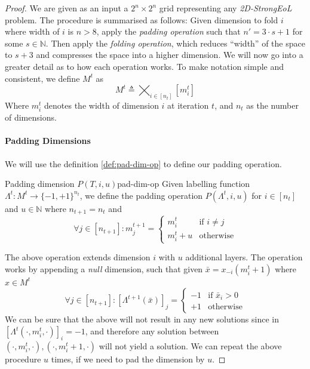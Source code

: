     \begin{proof}
        We are given as an input a $2^n \times 2^n$ grid representing any \textit{2D-StrongEoL} problem.
        The procedure is summarised as follows:
        Given dimension to fold $i$ where width of $i$ is $n > 8$, apply the \textit{padding operation} such that $n' = 3 \cdot s + 1$ for some $s \in \mathbb{N}$.
        Then apply the \textit{folding operation}, which reduces ``width'' of the space to
        $s + 3$ and compresses the space into a higher dimension.
        We will now go into a greater detail as to how each operation works.
        To make notation simple and consistent, we define $M^t$ as
        $$
            M^t \triangleq  \bigtimes_{i \in [n_t]} [m_i^t]
        $$
        Where $m_i^t$ denotes the width of dimension $i$ at iteration $t$, and $n_t$ as the number of dimensions.

        \paragraph*{Padding Dimensions} We will use the definition \ref{def:pad-dim-op} to define our padding operation.

        \begin{definitionbox}{Padding dimension $P(T,i,u)$}{pad-dim-op}
            Given labelling function $\Lambda^t: M^t \to \{-1,+1\}^{n_t}$, we define
            the padding operation $P(\Lambda^t, i, u)$ for $i \in [n_t]$ and $u \in \mathbb{N}$ where
            $n_{t+1} = n_t$ and
            $$
                \forall j \in [n_{t+1}]: m_j^{t+1} = \begin{cases}
                    m^t_i       & \text{if }  i \neq j \\
                    m^{t}_i + u & \text{otherwise}
                \end{cases}
            $$
        \end{definitionbox}

        The above operation extends dimension $i$ with $u$ additional layers.
        The operation works by appending a \textit{null} dimension, such that
        given $\bar{x} = x_{-i}(m_i^t + 1)$ where $x \in M^t$
        $$
            \forall j \in [n_{t+1}] : [\Lambda^{t+1}(\bar{x})]_j  = \begin{cases}
                -1 & \text{if } \bar{x}_i > 0 \\
                +1 & \text{otherwise}
            \end{cases}
        $$
        We can be sure that the above will not result in any new solutions since
        in $[\Lambda^t(\cdot, m^t_i, \cdot)]_i = -1$, and therefore
        any solution between  $(\cdot, m^t_i, \cdot), (\cdot, m^t_i+ 1, \cdot)$  will not yield a solution.
        We can repeat the above procedure $u$ times, if we need to pad the dimension by $u$.


\end{proof}
